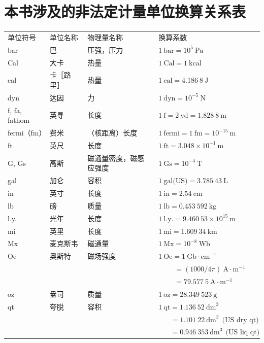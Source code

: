 \documentclass[UTF8, 12pt, a4paper, twoside]{ctexbook}
\begin{document}
\section*{本书涉及的非法定计量单位换算关系表
}

\vspace{10pt}
\begin{table}[!ht]
    \centering
    \renewcommand\arraystretch{1.4}
    \begin{tabularx}{\textwidth}{llll}
        单位符号 & 单位名称 & 物理量名称 & 换算系数 \\ 
        bar & 巴 & 压强，压力 & $1~\text{bar}=10^5~\text{Pa}$ \\ 
        Cal & 大卡 & 热量 & $1~\text{Cal}=1~\text{kcal}$ \\ 
        cal & 卡［路里］ & 热量 & $1~\text{cal}=4.186~8~\text{J}$ \\ 
        dyn & 达因 & 力 & $1~\text{dyn}=10^{-5}~\text{N}$ \\ 
        f, fa, fathom & 英寻 & 长度 & $1~\text{f}=2~\text{yd}=1.828~8~\text{m}$ \\ 
        fermi（fm） & 费米 & （核距离）长度 & $1~\text{fermi}=1~\text{fm}=10^{-15}~\text{m}$ \\ 
        ft & 英尺 & 长度 & $1~\text{ft}=3.048\times10^{-1}~\text{m}$ \\ 
        G, Gs & 高斯 & 磁通量密度，磁感应强度 & $1~\text{Gs}=10^{-4}~\text{T}$ \\ 
        gal & 加仑 & 容积 & $1~\text{gal(US)}=3.785~43~\text{L}$ \\ 
        in & 英寸 & 长度 & $1~\text{in}=2.54~\text{cm}$ \\ 
        lb & 磅 & 质量 & $1~\text{lb}=0.453~592~\text{kg}$ \\ 
        l.y. & 光年 & 长度 & $1~\text{l.y.}=9.460~53\times10^{15}~\text{m}$ \\ 
        mi & 英里 & 长度 & $1~\text{mi}=1.609~34~\text{km}$ \\ 
        Mx & 麦克斯韦 & 磁通量 & $1~\text{Mx}=10^{-8}~\text{Wb}$ \\ 
        Oe & 奥斯特 & 磁场强度 & $1~\text{Oe}=1~\text{Gb}\cdot\text{cm}^{-1}$ \\ 
        ~ & ~ & ~ & $\quad\quad~ =(1 000/4\pi)~\text{A}\cdot\text{m}^{-1}$ \\ 
        ~ & ~ & ~ & $\quad\quad~ =79.577~5~\text{A}\cdot\text{m}^{-1}$ \\ 
        oz & 盎司 & 质量 & $1~\text{oz}=28.349~523~\text{g}$ \\ 
        qt & 夸脱 & 容积 & $1~\text{qt}=1.136~52~\text{dm}^3$ \\ 
        ~ & ~ & ~ & $\quad~~~ =1.101~22~\text{dm}^3~~\text{(US dry qt)}$\\
        ~ & ~ & ~ & $\quad~~~ =0.946~353~\text{dm}^3~~\text{(US liq qt)}$\\
    \end{tabularx}
\end{table}
\end{document}
